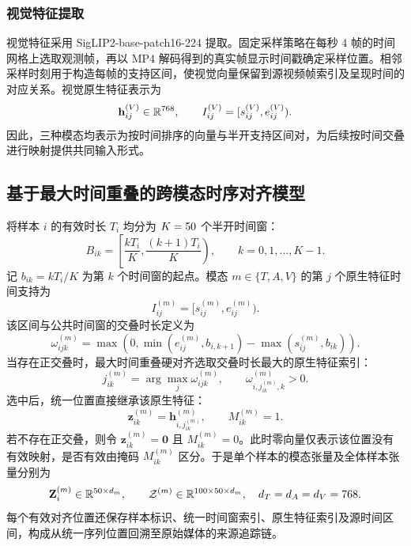 \subsubsection{视觉特征提取}\label{subsubsec:q1_vision}
视觉特征采用 SigLIP2-base-patch16-224 提取\cite{tschannen2025siglip2}。固定采样策略在每秒 4 帧的时间网格上选取观测帧，再以 MP4 解码得到的真实帧显示时间戳确定采样位置。相邻采样时刻用于构造每帧的支持区间，使视觉向量保留到源视频帧索引及呈现时间的对应关系。视觉原生特征表示为
\begin{equation}
\mathbf h_{ij}^{(V)}\in\mathbb R^{768},\qquad
I_{ij}^{(V)}=[s_{ij}^{(V)},e_{ij}^{(V)}).
\label{eq:q1_vision_feature}
\end{equation}
因此，三种模态均表示为按时间排序的向量与半开支持区间对，为后续按时间交叠进行映射提供共同输入形式。

\subsection{基于最大时间重叠的跨模态时序对齐模型}\label{subsec:q1_alignment}
将样本 $i$ 的有效时长 $T_i$ 均分为 $K=50$ 个半开时间窗：
\begin{equation}
B_{ik}=\left[\frac{kT_i}{K},\frac{(k+1)T_i}{K}\right),\qquad
k=0,1,\ldots,K-1.
\label{eq:q1_bins}
\end{equation}
记 $b_{ik}=kT_i/K$ 为第 $k$ 个时间窗的起点。模态 $m\in\{T,A,V\}$ 的第 $j$ 个原生特征时间支持为
\begin{equation}
I_{ij}^{(m)}=[s_{ij}^{(m)},e_{ij}^{(m)}).
\label{eq:q1_native_interval}
\end{equation}
该区间与公共时间窗的交叠时长定义为
\begin{equation}
\omega_{ijk}^{(m)}=\max\!\left(0,\min(e_{ij}^{(m)},b_{i,k+1})-\max(s_{ij}^{(m)},b_{ik})\right).
\label{eq:q1_overlap}
\end{equation}
当存在正交叠时，最大时间重叠硬对齐选取交叠时长最大的原生特征索引：
\begin{equation}
j_{ik}^{(m)}=\arg\max_j\omega_{ijk}^{(m)},\qquad
\omega_{i,j_{ik}^{(m)},k}^{(m)}>0.
\label{eq:q1_argmax}
\end{equation}
选中后，统一位置直接继承该原生特征：
\begin{equation}
\mathbf z_{ik}^{(m)}=\mathbf h_{i,j_{ik}^{(m)}}^{(m)},\qquad M_{ik}^{(m)}=1.
\label{eq:q1_hard_feature}
\end{equation}
若不存在正交叠，则令 $\mathbf z_{ik}^{(m)}=\mathbf 0$ 且 $M_{ik}^{(m)}=0$。此时零向量仅表示该位置没有有效映射，是否有效由掩码 $M_{ik}^{(m)}$ 区分。于是单个样本的模态张量及全体样本张量分别为
\begin{equation}
\mathbf Z_i^{(m)}\in\mathbb R^{50\times d_m},\qquad
\mathcal Z^{(m)}\in\mathbb R^{100\times50\times d_m},
\quad d_T=d_A=d_V=768.
\label{eq:q1_tensor_shape}
\end{equation}
每个有效对齐位置还保存样本标识、统一时间窗索引、原生特征索引及源时间区间，构成从统一序列位置回溯至原始媒体的来源追踪链。

